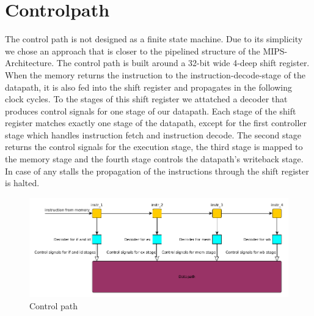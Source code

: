 \section{Controlpath}
The control path is not designed as a finite state machine. Due to its simplicity we chose an approach that is closer to the pipelined structure of the MIPS-Architecture. The control path is built around a 32-bit wide 4-deep shift register. When the memory returns the instruction to the instruction-decode-stage of the datapath, it is also fed into the shift register and propagates in the following clock cycles. To the stages of this shift register we attatched a decoder that produces control signals for one stage of our datapath. Each stage of the shift register matches exactly one stage of the datapath, except for the first controller stage which handles instruction fetch and instruction decode. The second stage returns the control signals for the execution stage, the third stage is mapped to the memory stage and the fourth stage controls the datapath's writeback stage. In case of any stalls the propagation of the instructions through the shift register is halted.
\begin{figure}[h!]
  \centering
  \includegraphics[width=1.0\textwidth]{figure/control.png}
  \caption{Control path}
  \label{fig:control}
\end{figure}
